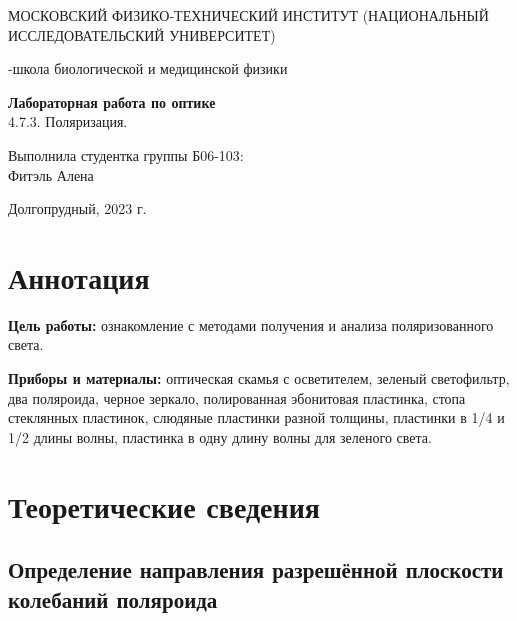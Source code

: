 \documentclass[a4paper,12pt]{article}
\begin{document}
\def\figurename{Рисунок}
\begin{titlepage}
\begin{center}
    {\large МОСКОВСКИЙ ФИЗИКО-ТЕХНИЧЕСКИЙ ИНСТИТУТ (НАЦИОНАЛЬНЫЙ ИССЛЕДОВАТЕЛЬСКИЙ УНИВЕРСИТЕТ)}
\end{center}
\begin{center}
    {-школа биологической и медицинской физики}
\end{center}

\vspace{1cm}
{\huge
\begin{center}
    {\bf Лабораторная работа по оптике}\\
    \vspace{0.5cm}
    4.7.3. Поляризация.
\end{center}
}

\vspace{4cm}
\begin{flushright}
{\LARGE Выполнила студентка группы Б06-103:\\ Фитэль Алена \\}

\end{flushright}
\vspace{9cm}
\begin{center}
    Долгопрудный, 2023 г.
\end{center}
\end{titlepage}
\newpage


\section{Аннотация}

\textbf{Цель работы:} ознакомление с методами получения и анализа поляризованного света.

\textbf{Приборы и материалы:} оптическая скамья с осветителем, зеленый светофильтр, два поляроида, черное зеркало, полированная эбонитовая пластинка, стопа стеклянных пластинок, слюдяные пластинки разной толщины, пластинки в 1/4 и 1/2 длины волны, пластинка в одну длину волны для зеленого света.


\section{Теоретические сведения}

\subsection{Определение направления разрешённой плоскости колебаний поляроида}
	
\end{document}
